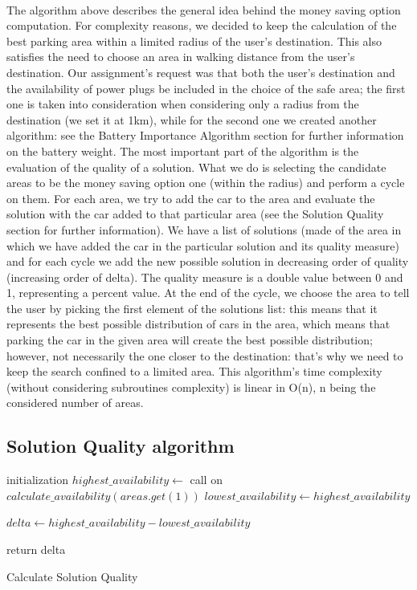 \paragraph{}The algorithm above describes the general idea behind the money saving option computation. For complexity reasons, we decided to keep the calculation of the best parking area within a limited radius of the user's destination. This also satisfies the need to choose an area in walking distance from the user's destination. 
Our assignment's request was that both the user's destination and the availability of power plugs be included in the choice of the safe area; the first one is taken into consideration when considering only a radius from the destination (we set it at 1km), while for the second one we created another algorithm: see the Battery Importance Algorithm section for further information on the battery weight.
The most important part of the algorithm is the evaluation of the quality of a solution. What we do is selecting the candidate areas to be the money saving option one (within the radius) and perform a cycle on them. For each area, we try to add the car to the area and evaluate the solution with the car added to that particular area (see the Solution Quality section for further information). We have a list of solutions (made of the area in which we have added the car in the particular solution and its quality measure) and for each cycle we add the new possible solution in decreasing order of quality (increasing order of delta). The quality measure is a double value between 0 and 1, representing a percent value. 
At the end of the cycle, we choose the area to tell the user by picking the first element of the solutions list: this means that it represents the best possible distribution of cars in the area, which means that parking the car in the given area will create the best possible distribution; however, not necessarily the one closer to the destination: that's why we need to keep the search confined to a limited area.
This algorithm's time complexity (without considering subroutines complexity) is linear in O(n), n being the considered number of areas.

\subsection{Solution Quality algorithm}

\begin{algorithm}
	initialization\;
	$highest\_availability \leftarrow$ call on $calculate\_availability(areas.get(1))$\;
	$lowest\_availability \leftarrow highest\_availability$\;
	
	$delta \leftarrow highest\_availability - lowest\_availability$\;
	
	return delta\;
	\caption{Calculate Solution Quality}
\end{algorithm}

